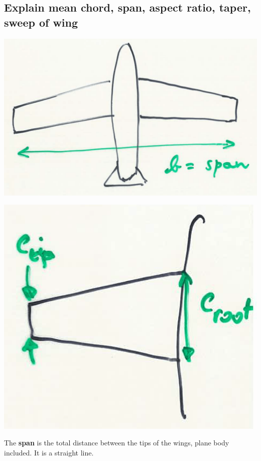 \documentclass[british,french,11pt, a4paper, openany]{article}
\begin{document}
\subsection{Explain mean chord, span, aspect ratio, taper, sweep of wing}
\begin{center}
	\begin{minipage}{0.4\textwidth}
		\includegraphics[scale=0.1]{ch3/1}
	\end{minipage}
	\begin{minipage}{0.3\textwidth}
		\includegraphics[scale=0.15]{ch3/2}
	\end{minipage}
\end{center}
The \textbf{span} is the total distance between the tips of the wings, plane body included. It is a straight line.\\
\end{document}
